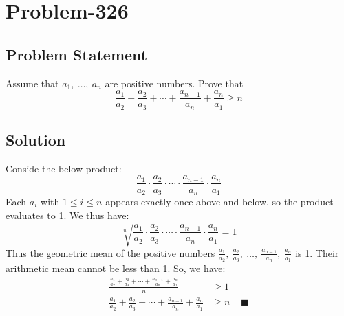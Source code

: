 \documentclass{article}
\begin{document}
\section*{Problem-326}
\subsection*{Problem Statement}
Assume that $a_1,\ \ldots,\ a_n$ are positive numbers. Prove that
\[
	\frac{a_1}{a_2} + \frac{a_2}{a_3} + \cdots + \frac{a_{n-1}}{a_n} + \frac{a_n}{a_1} \geq n
\]

\subsection*{Solution}
Conside the below product:
\[
	\frac{a_1}{a_2} \cdot \frac{a_2}{a_3} \cdot \cdots \cdot \frac{a_{n-1}}{a_n} \cdot \frac{a_n}{a_1}
\]
Each $a_i$ with $1 \leq i \leq n$ appears exactly once above and below, so the product evaluates to 1. We thus have:
\[
	\sqrt[n]{\frac{a_1}{a_2} \cdot \frac{a_2}{a_3} \cdot \cdots \cdot \frac{a_{n-1}}{a_n} \cdot \frac{a_n}{a_1}} = 1
\]
Thus the geometric mean of the positive numbers $\frac{a_1}{a_2},\ \frac{a_2}{a_3},\ \ldots,\ \frac{a_{n-1}}{a_n},\ \frac{a_n}{a_1}$ is 1. Their arithmetic mean cannot be less than 1. So, we have:
\begin{equation*}
	\begin{aligned}
		\frac{\frac{a_1}{a_2} + \frac{a_2}{a_3} + \cdots + \frac{a_{n-1}}{a_n} + \frac{a_n}{a_1}}{n} &\geq 1\\
		\frac{a_1}{a_2} + \frac{a_2}{a_3} + \cdots + \frac{a_{n-1}}{a_n} + \frac{a_n}{a_1} &\geq n\ \ \ \ \ \blacksquare
	\end{aligned}
\end{equation*}
\end{document}
